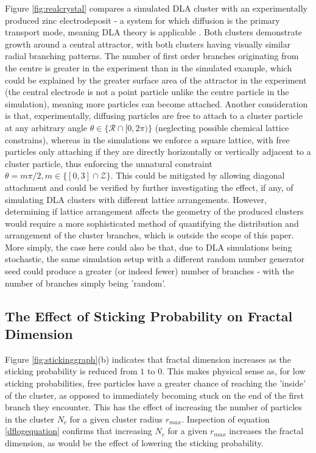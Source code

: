 \documentclass[11pt]{iopart}
\begin{document}
Figure \ref{fig:realcrystal} compares a simulated DLA cluster with an experimentally produced zinc electrodeposit - a system for which diffusion is the primary transport mode, meaning DLA theory is applicable \cite{dla}. Both clusters demonstrate growth around a central attractor, with both clusters having visually similar radial branching patterns. The number of first order branches originating from the centre is greater in the experiment than in the simulated example, which could be explained by the greater surface area of the attractor in the experiment (the central electrode is not a point particle unlike the centre particle in the simulation), meaning more particles can become attached. Another consideration is that, experimentally, diffusing particles are free to attach to a cluster particle at any arbitrary angle $\theta \in \{\mathcal{R} \cap [0, 2\pi) \}$ (neglecting possible chemical lattice constrains), whereas in the simulations we enforce a square lattice, with free particles only attaching if they are directly horizontally or vertically adjacent to a cluster particle, thus enforcing the unnatural constraint $\theta = m\pi/2, m \in \{[0,3] \cap \mathcal{Z}\}$. This could be mitigated by allowing diagonal attachment and could be verified by further investigating the effect, if any, of simulating DLA clusters with different lattice arrangements. However, determining if lattice arrangement affects the geometry of the produced clusters would require a more sophisticated method of quantifying the distribution and arrangement of the cluster branches, which is outside the scope of this paper.  More simply, the case here could also be that, due to DLA simulations being stochastic, the same simulation setup with a different random number generator seed could produce a greater (or indeed fewer) number of branches -  with the number of branches simply being 'random'.

\subsection{The Effect of Sticking Probability on Fractal Dimension}

Figure \ref{fig:stickinggraph}(b) indicates that fractal dimension increases as the sticking probability is reduced from $1$ to $0$. This makes physical sense as, for low sticking probabilities, free particles have a greater chance of reaching the 'inside' of the cluster, as opposed to immediately becoming stuck on the end of the first branch they encounter. This has the effect of increasing the number of particles in the cluster $N_c$ for a given cluster radius $r_{max}$. Inspection of equation \ref{dflogequation} confirms that increasing $N_c$ for a given $r_{max}$ increases the fractal dimension, as would be the effect of lowering the sticking probability.
\end{document}
